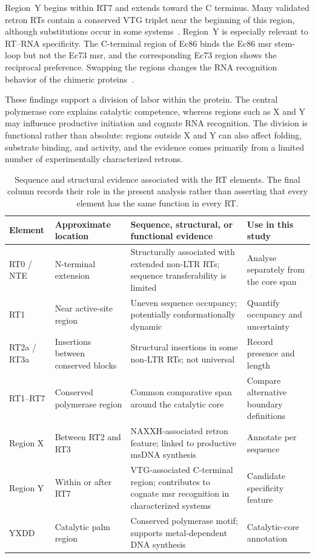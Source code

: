 Region~Y begins within RT7 and extends toward the C terminus. Many validated
retron RTs contain a conserved VTG triplet near the beginning of this region,
although substitutions occur in some systems~\cite{toro2014}. Region~Y is
especially relevant to RT--RNA specificity. The C-terminal region of Ec86
binds the Ec86 msr stem-loop but not the Ec73 msr, and the corresponding Ec73
region shows the reciprocal preference. Swapping the regions changes the RNA
recognition behavior of the chimeric proteins~\cite{inouye1999,mestre2020}.

These findings support a division of labor within the protein. The central
polymerase core explains catalytic competence, whereas regions such as X and Y
may influence productive initiation and cognate RNA recognition. The division
is functional rather than absolute: regions outside X and Y can also affect
folding, substrate binding, and activity, and the evidence comes primarily
from a limited number of experimentally characterized retrons.

\begin{table}[ht]
\centering
\scriptsize
\setlength{\tabcolsep}{3.5pt}
\begin{tabularx}{\textwidth}{@{}p{1.7cm}p{2.5cm}X p{2.9cm}@{}}
\toprule
\textbf{Element} & \textbf{Approximate location} & \textbf{Sequence, structural, or functional evidence} & \textbf{Use in this study}\\
\midrule
RT0 / NTE & N-terminal extension & Structurally associated with extended non-LTR RTs; sequence transferability is limited~\cite{blocker2005,simon2008} & Analyse separately from the core span\\
RT1 & Near active-site region & Uneven sequence occupancy; potentially conformationally dynamic & Quantify occupancy and uncertainty\\
RT2a / RT3a & Insertions between conserved blocks & Structural insertions in some non-LTR RTs; not universal & Record presence and length\\
RT1--RT7 & Conserved polymerase region & Common comparative span around the catalytic core & Compare alternative boundary definitions\\
Region X & Between RT2 and RT3 & NAXXH-associated retron feature; linked to productive msDNA synthesis~\cite{toro2014,mestre2020} & Annotate per sequence\\
Region Y & Within or after RT7 & VTG-associated C-terminal region; contributes to cognate msr recognition in characterized systems~\cite{inouye1999} & Candidate specificity feature\\
YXDD & Catalytic palm region & Conserved polymerase motif; supports metal-dependent DNA synthesis & Catalytic-core annotation\\
\bottomrule
\end{tabularx}
\caption[Evidence associated with RT elements]{Sequence and structural evidence associated with the RT elements. The final column records their role in the present analysis rather than asserting that every element has the same function in every RT.}
\label{tab:rt-elements-integrated}
\end{table}

